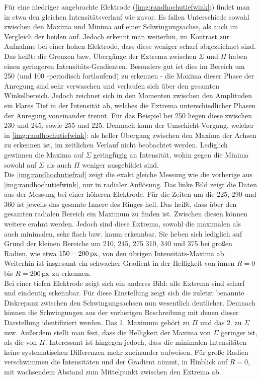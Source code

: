     Für eine niedriger angebrachte Elektrode (\autoref{img:randhochutiefwink}:\underline{}) findet man in etwa den gleichen Intensitätsverlauf wie zuvor. Es fallen Unterschiede sowohl zwischen den Maxima und Minima auf einer Schwingungsachse, als auch im Vergleich der beiden auf. Jedoch erkennt man weiterhin, im Kontrast zur Aufnahme bei einer hohen Elektrode, dass diese weniger scharf abgezeichnet sind. Das heißt: die Grenzen bzw. Übergänge der Extrema zwischen $\Sigma$ und $\Pi$ haben einen geringeren Intensitäts-Gradienten. Besonders gut ist dies im Bereich um  250 (und 100 -periodisch fortlaufend) zu erkennen - die Maxima dieser Phase der Anregung sind sehr verwaschen und verlaufen sich über den gesamten Winkelbereich. Jedoch zeichnet sich in den Momenten zwischen den Amplituden ein klares Tief in der Intensität ab, welches die Extrema unterschiedlicher Phasen der Anregung voneinander trennt. Für das Beispiel bei   250 liegen diese zwischen  230 und 245, sowie 255 und 225. Demnach kann der Umschicht-Vorgang, welcher in \autoref{img:randhochutiefwink}:\underline{} als heller Übergang zwischen den Maxima der Achsen zu erkennen ist, im zeitlichen Verlauf nicht beobachtet werden. Lediglich gewinnen die Maxima auf $\Sigma$ geringfügig an Intensität, wohin gegen die Minima sowohl auf $\Sigma$ als auch $\Pi$ weniger ausgebildet sind.\\
    Die \autoref{img:randhochutiefrad} zeigt die exakt gleiche Messung wie die vorherige aus \autoref{img:randhochutiefwink}, nur in radialer Auflösung. Das linke Bild zeigt die Daten aus der Messung bei einer höheren Elektrode. Für die Zeiten um die  225, 290 und 360 ist jeweils das gesamte Innere des Ringes hell. Das heißt, dass über den gesamten radialen Bereich ein Maximum zu finden ist. Zwischen diesen können weitere erahnt werden. Jedoch sind diese Extrema, sowohl die maximalen als auch minimalen, sehr flach bzw. kaum erkennbar. Sie heben sich lediglich auf Grund der kleinen Bereiche um  210, 245, 275 310, 340 und 375 bei großen Radien, wie etwa $\unit[150-200]{px}$, von den übrigen Intensitäts-Maxima ab. Weiterhin ist insgesamt ein schwacher Gradient in der Helligkeit von innen $R=0$ bis $R=\unit[200]{px}$ zu erkennen.\\
    Bei einer tiefen Elektrode zeigt sich ein anderes Bild: alle Extrema sind scharf und eindeutig erkennbar. Für diese Einstellung zeigt sich die zuletzt benannte Diskrepanz zwischen den Schwingungsachsen nun wesentlich deutlicher. Demnach können die Schwingungen aus der vorherigen Beschreibung mit denen dieser Darstellung identifiziert werden. Das 1. Maximum gehört zu $\Pi$ und das 2. zu $\Sigma$ usw. Außerdem stellt man fest, dass die Helligkeit der Maxima von $\Sigma$ geringer ist, als die von $\Pi$. Interessant ist hingegen jedoch, dass die minimalen Intensitäten keine systematischen Differenzen mehr zueinander aufweisen. Für große Radien verschwimmen die Intensitäten und der Gradient nimmt, in Hinblick auf $R=0$, mit wachsendem Abstand zum Mittelpunkt zwischen den Extrema ab.

